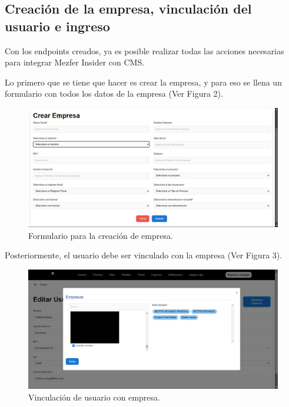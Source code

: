 \subsection{Creación de la empresa, vinculación del usuario e ingreso}
Con los endpoints creados, ya es posible realizar todas las acciones necesarias para integrar Mezfer Insider con CMS.

Lo primero que se tiene que hacer es crear la empresa, y para eso se llena un formulario con todos los datos de la empresa (Ver Figura 2).
    \begin{figure}[H]
        \begin{center}
            \includegraphics[scale=0.35]{img/actividades/integracion/formulario-empresa.png}
            \caption{Formulario para la creación de empresa.}
            \label{fig:formulario-empresa}
        \end{center}
    \end{figure}
Posteriormente, el usuario debe ser vinculado con la empresa (Ver Figura 3).
    \begin{figure}[H]
        \begin{center}
            \includegraphics[scale=0.35]{img/actividades/integracion/vincular-usuario.png}
            \caption{Vinculación de usuario con empresa.}
            \label{fig:vincular-usuario}
        \end{center}
    \end{figure}
